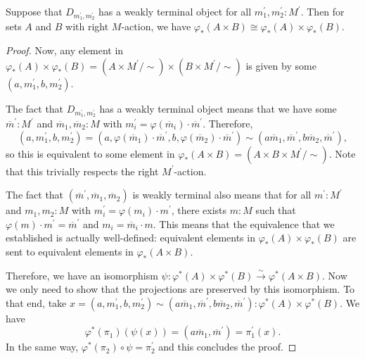 \begin{lemma}\label{lem:scalar-extension-product}
  Suppose that $ D_{m^\prime_1, m^\prime_2} $ has a weakly terminal object for all $ m^\prime_1, m^\prime_2: M^\prime $. Then for sets $ A $ and $ B $ with right $ M $-action, we have $ \varphi_*(A \times B) \cong \varphi_*(A) \times \varphi_*(B) $.
\end{lemma}
\begin{proof}
  Now, any element in $ \varphi_*(A) \times \varphi_*(B) = (A \times M^\prime / \sim) \times (B \times M^\prime / \sim) $ is given by some $ (a, m^\prime_1, b, m^\prime_2) $.

  The fact that $ D_{m^\prime_1, m^\prime_2} $ has a weakly terminal object means that we have some $ \overline m^\prime: M^\prime $ and $ \overline m_1, \overline m_2: M $ with $ m_i^\prime = \varphi(\overline m_i) \cdot \overline m^\prime $. Therefore,
  \[ (a, m^\prime_1, b, m^\prime_2) = (a, \varphi(\overline m_1) \cdot \overline m^\prime, b, \varphi(\overline m_2) \cdot \overline m^\prime) \sim (a \overline m_1, \overline m^\prime, b \overline m_2, \overline m^\prime), \]
  so this is equivalent to some element in $ \varphi_*(A \times B) = (A \times B \times M^\prime / \sim) $. Note that this trivially respects the right $ M^\prime $-action.

  The fact that $ (\overline m^\prime, \overline m_1, \overline m_2) $ is weakly terminal also means that for all $ m^\prime: M^\prime $ and $ m_1, m_2: M $ with $ m_i^\prime = \varphi(m_i) \cdot m^\prime $, there exists $ m: M $ such that $ \varphi(m) \cdot m^\prime = \overline m^\prime $ and $ m_i = \overline m_i \cdot m $. This means that the equivalence that we established is actually well-defined: equivalent elements in $ \varphi_*(A) \times \varphi_*(B) $ are sent to equivalent elements in $ \varphi_*(A \times B) $.

  Therefore, we have an isomorphism $ \psi: \varphi^*(A) \times \varphi^*(B) \xrightarrow{\sim} \varphi^*(A \times B) $. Now we only need to show that the projections are preserved by this isomorphism. To that end, take $ x = (a, m^\prime_1, b, m^\prime_2) \sim (a \overline m_1, \overline m^\prime, b \overline m_2, \overline m^\prime) : \varphi^*(A) \times \varphi^*(B) $. We have
  \[ \varphi^*(\pi_1)(\psi(x)) = (a \overline m_1, \overline m^\prime) = \pi^\prime_1(x). \]
  In the same way, $ \varphi^*(\pi_2) \circ \psi = \pi^\prime_2 $ and this concludes the proof.
\end{proof}


